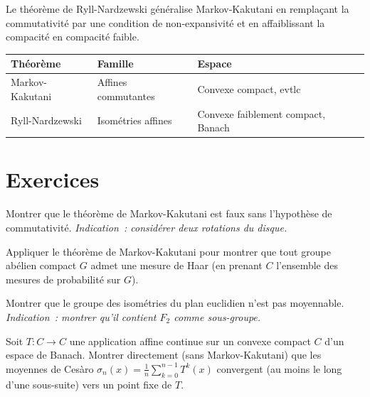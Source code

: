\begin{remarque}
Le th\'eor\`eme de Ryll-Nardzewski g\'en\'eralise Markov-Kakutani en rempla\c{c}ant la
commutativit\'e par une condition de non-expansivit\'e et en affaiblissant la compacit\'e
en compacit\'e faible.
\end{remarque}

\begin{formules}[title=\textbf{Points fixes communs}]
\begin{center}
\renewcommand{\arraystretch}{1.3}
\begin{tabular}{|l|l|l|}
\hline
\textbf{Th\'eor\`eme} & \textbf{Famille} & \textbf{Espace} \\
\hline
Markov-Kakutani & Affines commutantes & Convexe compact, evtlc \\
Ryll-Nardzewski & Isom\'etries affines & Convexe faiblement compact, Banach \\
\hline
\end{tabular}
\end{center}
\end{formules}

\section{Exercices}

\begin{exercice}
Montrer que le th\'eor\`eme de Markov-Kakutani est faux sans l'hypoth\`ese de
commutativit\'e. \emph{Indication~: consid\'erer deux rotations du disque.}
\end{exercice}

\begin{exercice}
Appliquer le th\'eor\`eme de Markov-Kakutani pour montrer que tout groupe ab\'elien
compact $G$ admet une mesure de Haar (en prenant $C$ l'ensemble des mesures de probabilit\'e
sur $G$).
\end{exercice}

\begin{exercice}
Montrer que le groupe des isom\'etries du plan euclidien n'est pas moyennable.
\emph{Indication~: montrer qu'il contient $F_2$ comme sous-groupe.}
\end{exercice}

\begin{exercice}
Soit $T\colon C \to C$ une application affine continue sur un convexe compact $C$ d'un
espace de Banach. Montrer directement (sans Markov-Kakutani) que les moyennes de Ces\`aro
$\sigma_n(x) = \frac{1}{n}\sum_{k=0}^{n-1} T^k(x)$ convergent (au moins le long d'une
sous-suite) vers un point fixe de $T$.
\end{exercice}

